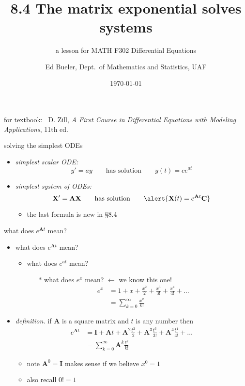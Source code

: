 \documentclass[urlcolor=blue,dvipsnames]{beamer}
\title{8.4 The matrix exponential solves systems}
\subtitle{a lesson for MATH F302 Differential Equations}
\author{Ed Bueler, Dept.~of Mathematics and Statistics, UAF}
\date{\tiny \today}
\newcommand{\bA}{\mathbf{A}}
\newcommand{\bC}{\mathbf{C}}
\newcommand{\bI}{\mathbf{I}}
\newcommand{\bX}{\mathbf{X}}
\begin{document}
\renewcommand{\thefootnote}{{\color{green} \arabic{footnote}}}

\begin{frame}
\titlepage

\centerline{\tiny for textbook: \, D. Zill, \emph{A First Course in Differential Equations with Modeling Applications}, 11th ed.}
\end{frame}


\begin{frame}{solving the simplest ODEs}

\begin{itemize}
\item \emph{simplest scalar ODE:}
    $$y'=ay \qquad \text{has solution} \qquad y(t) = c e^{at}$$

\bigskip
\item \emph{simplest system of ODEs:}
    $$\bX'=\bA \bX \qquad \text{has solution} \qquad \alert{\bX(t) = e^{\bA t}\bC}$$
    \begin{itemize}
    \item the last formula is \alert{new in \S8.4}
    \end{itemize}
\end{itemize}
\end{frame}


\begin{frame}{what does $e^{\bA t}$ mean?}

\begin{itemize}
\item what does $e^{\bA t}$ mean?
   \begin{itemize}
   \item what does $e^{at}$ mean?
       \begin{itemize}
       \item[$\ast$] what does $e^x$ mean?  \alert{$\longleftarrow$ we know this one!}
\begin{align*}
e^x &= 1 + x + \frac{x^2}{2} + \frac{x^3}{3!} + \frac{x^4}{4!} + \dots \\
    &= \sum_{k=0}^\infty \frac{x^k}{k!}
\end{align*}
       \end{itemize}
   \end{itemize}

\medskip
\item \emph{definition.} if $\bA$ is a square matrix and $t$ is any number then
\begin{align*}
e^{\bA t} &= \bI + \bA t + \bA^2 \frac{t^2}{2} + \bA^3 \frac{t^3}{3!} + \bA^4 \frac{t^4}{4!} + \dots \\
    &= \sum_{k=0}^\infty \bA^k \frac{t^k}{k!}
\end{align*}
   \begin{itemize}
   \item note $\bA^0 = \bI$ makes sense if we believe $x^0=1$
   \item also recall $0!=1$
   \end{itemize}
\end{itemize}
\end{frame}
\end{document}
